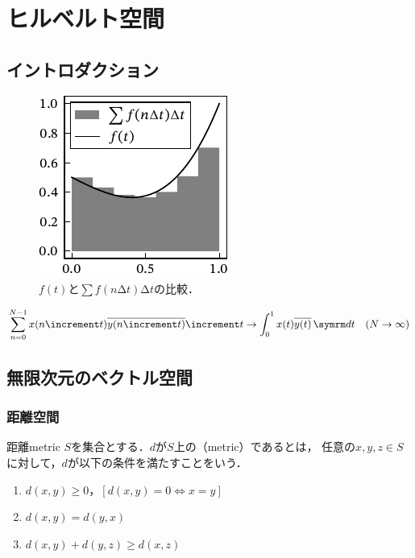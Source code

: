 \documentclass[../../main]{subfiles}
\begin{document}
\chapter{ヒルベルト空間}
\label{chapter:hilbert_space}

\section{イントロダクション}

\begin{figure}[htbp]
  \centering
  \includegraphics{figures/riemann_sum.pdf}
  \caption{\(f(t)\)と\(\sum f(n\increment t)\increment t\)の比較．}
\end{figure}

\[
  \sum_{n=0}^{N-1}x(n\increment t)\conj*{y(n\increment t)}\increment t \to \int_0^1x(t)\conj*{y(t)}\intd{t}\quad(N\to\infty)
\]

\pagebreak

\section{無限次元のベクトル空間}

\subsection{距離空間}

\begin{definition}{距離}{metric}
  \(S\)を集合とする．\(d\)が\(S\)上の（metric）であるとは，
  任意の\(x,y,z\in S\)に対して，\(d\)が以下の条件を満たすことをいう．
  \begin{enumerate}
    \item \(d(x,y)\geq 0\)，\([d(x,y)=0\iff x=y]\)
    \item \(d(x,y)=d(y,x)\)
    \item \(d(x,y)+d(y,z)\geq d(x,z)\)
  \end{enumerate}
\end{definition}
\end{document}
